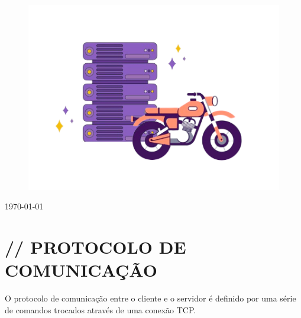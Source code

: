 \documentclass[12pt]{article}
\begin{document}
\begin{titlepage}
\begin{figure}[H]
    \centering
    \includegraphics[width=12cm]{ilustracaocapa}
\end{figure}
	
	\vfill\vfill\vfill %
	
	{\large\today} %
	
	
	 
	
	\vfill %
	
\end{titlepage}






\section{// PROTOCOLO DE COMUNICAÇÃO}
O protocolo de comunicação entre o cliente e o servidor é definido por uma série de comandos trocados através de uma conexão TCP.\\
\end{document}
